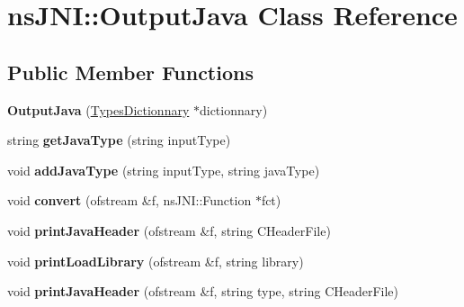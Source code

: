 \hypertarget{classnsJNI_1_1OutputJava}{\section{ns\-J\-N\-I\-:\-:\-Output\-Java \-Class \-Reference}
\label{classnsJNI_1_1OutputJava}
}
\subsection*{\-Public \-Member \-Functions}
\begin{DoxyCompactItemize}
\item 
\hypertarget{classnsJNI_1_1OutputJava_a3334f4f2f7648d4a4ee2193e96ce477e}{{\bfseries \-Output\-Java} (\hyperlink{classnsJNI_1_1TypesDictionnary}{\-Types\-Dictionnary} $\ast$dictionnary)}\label{classnsJNI_1_1OutputJava_a3334f4f2f7648d4a4ee2193e96ce477e}

\item 
\hypertarget{classnsJNI_1_1OutputJava_a5e91b0ad0c23a77f5f012bb3a48ca9ad}{string {\bfseries get\-Java\-Type} (string input\-Type)}\label{classnsJNI_1_1OutputJava_a5e91b0ad0c23a77f5f012bb3a48ca9ad}

\item 
\hypertarget{classnsJNI_1_1OutputJava_af9a2e40527ff6fc1e96a7f655fd726c1}{void {\bfseries add\-Java\-Type} (string input\-Type, string java\-Type)}\label{classnsJNI_1_1OutputJava_af9a2e40527ff6fc1e96a7f655fd726c1}

\item 
\hypertarget{classnsJNI_1_1OutputJava_ab141e08ef4e235ce8f4542985c5c4470}{void {\bfseries convert} (ofstream \&f, ns\-J\-N\-I\-::\-Function $\ast$fct)}\label{classnsJNI_1_1OutputJava_ab141e08ef4e235ce8f4542985c5c4470}

\item 
\hypertarget{classnsJNI_1_1OutputJava_a73031c1e6282f5cc49d77e3eafefa236}{void {\bfseries print\-Java\-Header} (ofstream \&f, string \-C\-Header\-File)}\label{classnsJNI_1_1OutputJava_a73031c1e6282f5cc49d77e3eafefa236}

\item 
\hypertarget{classnsJNI_1_1OutputJava_a1adb517a80967906b11b6174f981ac24}{void {\bfseries print\-Load\-Library} (ofstream \&f, string library)}\label{classnsJNI_1_1OutputJava_a1adb517a80967906b11b6174f981ac24}

\item 
\hypertarget{classnsJNI_1_1OutputJava_a320a6de5275f14f5c4eb612604314d65}{void {\bfseries print\-Java\-Header} (ofstream \&f, string type, string \-C\-Header\-File)}\label{classnsJNI_1_1OutputJava_a320a6de5275f14f5c4eb612604314d65}


\end{DoxyCompactItemize}
